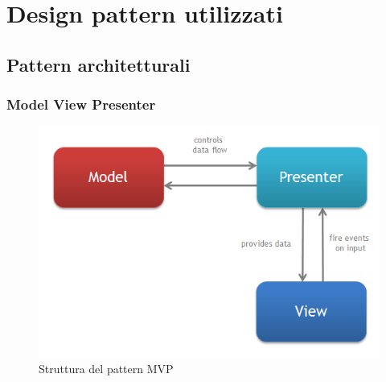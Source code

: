\newcommand{\utilizzo}{\item \textbf{Utilizzo nel progetto}}

\section{Design pattern utilizzati}
\label{pattern}
\subsection{Pattern architetturali}
	\subsubsection{Model View Presenter}
	
		\begin{figure}[!h]
			\centering
			\includegraphics[scale=0.5]{img/mvp}  
			\caption{Struttura del pattern MVP}
		\end{figure}
		
